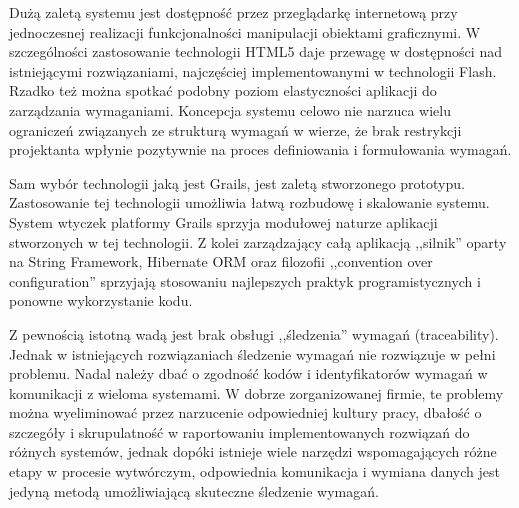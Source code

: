     Dużą zaletą systemu jest dostępność przez przeglądarkę internetową przy jednoczesnej realizacji funkcjonalności manipulacji obiektami graficznymi. W szczególności zastosowanie technologii HTML5 daje przewagę w dostępności nad istniejącymi rozwiązaniami, najczęściej implementowanymi w technologii Flash. Rzadko też można spotkać podobny poziom elastyczności aplikacji do zarządzania wymaganiami. Koncepcja systemu celowo nie narzuca wielu ograniczeń związanych ze strukturą wymagań w wierze, że brak restrykcji projektanta wpłynie pozytywnie na proces definiowania i formułowania wymagań. 

    Sam wybór technologii jaką jest Grails, jest zaletą stworzonego prototypu. Zastosowanie tej technologii umożliwia łatwą rozbudowę i skalowanie systemu. System wtyczek platformy Grails sprzyja modułowej naturze aplikacji stworzonych w tej technologii. Z kolei zarządzający całą aplikacją ,,silnik'' oparty na String Framework, Hibernate ORM oraz filozofii ,,convention over configuration'' sprzyjają stosowaniu najlepszych praktyk programistycznych i ponowne wykorzystanie kodu.

    Z pewnością istotną wadą jest brak obsługi ,,śledzenia'' wymagań (traceability). Jednak w istniejących rozwiązaniach śledzenie wymagań nie rozwiązuje w pełni problemu. Nadal należy dbać o zgodność kodów i identyfikatorów wymagań w komunikacji z wieloma systemami. W dobrze zorganizowanej firmie, te problemy można wyeliminować przez narzucenie odpowiedniej kultury pracy, dbałość o szczegóły i skrupulatność w raportowaniu implementowanych rozwiązań do różnych systemów, jednak dopóki istnieje wiele narzędzi wspomagających różne etapy w procesie wytwórczym, odpowiednia komunikacja i wymiana danych jest jedyną metodą umożliwiającą skuteczne śledzenie wymagań.
